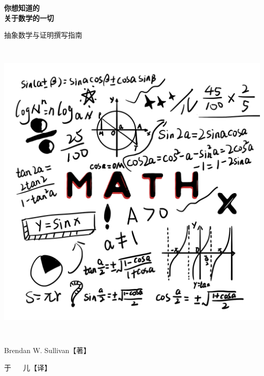 
\vfill

\begin{center}
\thispagestyle{empty}

{\cabin\bfseries\fontsize{50pt}{50pt} \selectfont
你想知道的\\关于数学的一切\\[0.5ex]
}

\vspace{1cm}

{\sansa\fontsize{30pt}{40pt} \selectfont
抽象数学与证明撰写指南
}

\vfill
\includegraphics[width=15cm,height=15cm]{figure/cover.png}

\vfill

{\Large Brendan W. Sullivan【著】\\[0.5ex]}

{\Large 于 $\quad$ 儿【译】\\}

\vfill

\end{center}
